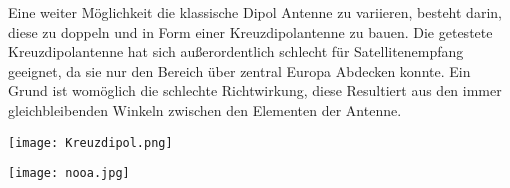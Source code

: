 \begin{multicols*}{2}
    Eine weiter Möglichkeit die klassische Dipol Antenne zu variieren, besteht darin, diese zu doppeln und in Form einer Kreuzdipolantenne zu bauen. Die getestete Kreuzdipolantenne hat sich außerordentlich schlecht für Satellitenempfang geeignet, da sie nur den Bereich über zentral Europa Abdecken konnte. Ein Grund ist womöglich die schlechte Richtwirkung, diese Resultiert aus den immer gleichbleibenden Winkeln zwischen den Elementen der Antenne. 

\end{multicols*}


\begin{center}
    \centering
    \texttt{[image: Kreuzdipol.png]}
\end{center}

\begin{center}
    \centering
    \texttt{[image: nooa.jpg]}
\end{center}



